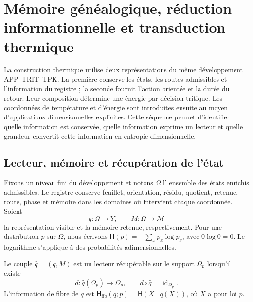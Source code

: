 
\section{Mémoire généalogique, réduction informationnelle et transduction thermique}
\label{v:ant:sec:ii-kb-aut-desarrollo}

La construction thermique utilise deux représentations du même développement
APP--TRIT--TPK. La première conserve les états, les routes admissibles et
l’information du registre ; la seconde fournit l’action orientée
et la durée du retour. Leur composition détermine une énergie par
décision tritique. Les coordonnées de température et d’énergie sont introduites
ensuite au moyen d’applications dimensionnelles explicites. Cette séquence
permet d’identifier quelle information est conservée, quelle information exprime
un lecteur et quelle grandeur convertit cette information en entropie dimensionnelle.

\subsection{Lecteur, mémoire et récupération de l'état}

Fixons un niveau fini du développement et notons \(\Omega\) l'
ensemble des états enrichis admissibles. Le registre conserve feuillet,
orientation, résidu, quotient, retenue, route, phase et mémoire dans les
domaines où intervient chaque coordonnée. Soient
\[
 q:\Omega\longrightarrow Y,\qquad
 M:\Omega\longrightarrow\mathcal M
\]
la représentation visible et la mémoire retenue, respectivement. Pour une
distribution \(p\) sur \(\Omega\), nous écrivons
\(\mathsf H(p)=-\sum_xp_x\log p_x\), avec \(0\log0=0\).
Le logarithme s’applique à des probabilités adimensionnelles.

\begin{definition}
Le couple \(\widehat q=(q,M)\) est un lecteur récupérable sur le support
\(\Omega_p\) lorsqu'il existe
\[
 d:\widehat q(\Omega_p)\longrightarrow\Omega_p,
 \qquad d\circ\widehat q=\operatorname{id}_{\Omega_p}.
\]
L'information de fibre de \(q\) est
\(\mathsf H_{\mathrm{fib}}(q;p)=\mathsf H(X\mid q(X))\), où
\(X\) a pour loi \(p\).
\end{definition}

